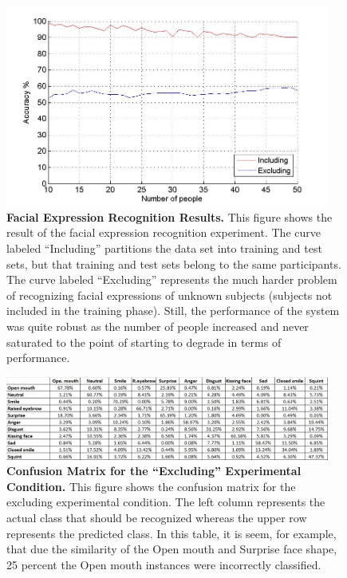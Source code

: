 \documentclass[]{article}
\begin{document}
\begin{figure}[ht]
\begin{center}
\vspace{-3mm}
\includegraphics[width=0.95\textwidth]{figures/figureRecognizeFacialExpressionTrue.jpg}
\end{center}
\caption{\textbf{Facial Expression Recognition Results.} This figure shows the result of the facial expression
recognition experiment. The curve labeled ``Including'' partitions the data set into training and test sets, but that
training and test sets belong to the same participants. The curve labeled ``Excluding'' represents the much harder
problem of recognizing facial expressions of unknown subjects (subjects not included in the training phase). Still, the performance 
of the system was quite robust as the number of people increased and never saturated to the point of starting to
degrade in terms of performance.}
\label{feRecognition}
\end{figure}


\begin{figure}[ht]
\begin{center}
\vspace{-3mm}
\includegraphics[width=0.95\textwidth]{figures/confusionExcluding.jpg}
\end{center}
\caption{\textbf{Confusion Matrix for the ``Excluding'' Experimental Condition.} This figure
shows the confusion matrix for the excluding experimental condition. The left column represents the
actual class that should be recognized whereas the upper row represents the
predicted class. In this table, it is seem, for example, that due the similarity
of the Open mouth and Surprise face shape, 25 percent the Open mouth instances were
incorrectly classified.}
\label{coExcluding}
\end{figure}
\end{document}
